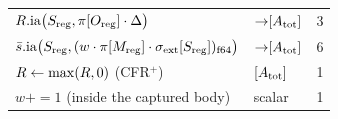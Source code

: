 \begin{table}[!htb]
{\begin{tabular}{@{}llr@{}}
$R.\mathrm{ia}\big(S_{\mathrm{reg}}, \pi[O_{\mathrm{reg}}] \cdot \Delta\big)$ & ${\to} [A_{\mathrm{tot}}]$ & 3 \\
$\bar{s}.\mathrm{ia}\big(S_{\mathrm{reg}}, (w \cdot \pi[M_{\mathrm{reg}}] \cdot \sigma_{\mathrm{ext}}[S_{\mathrm{reg}}])_{\mathrm{f64}}\big)$ & ${\to} [A_{\mathrm{tot}}]$ & 6 \\
$R \gets \max(R, 0)$ \; (CFR$^{+}$) & $[A_{\mathrm{tot}}]$ & 1 \\
$w \mathrel{{+}{=}} 1$ \; (inside the captured body) & scalar & 1 \\
\bottomrule
\end{tabular}}
\end{table}

